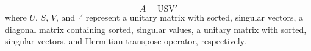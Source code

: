 \begin{equation} \label{eq:svd-cond}
	A=\text{USV}'
\end{equation}
where $U$, $S$, $V$, and $\cdot '$ represent a unitary matrix with sorted, singular vectors, a diagonal matrix containing sorted, singular values, a unitary matrix with sorted, singular vectors, and Hermitian transpose operator, respectively.